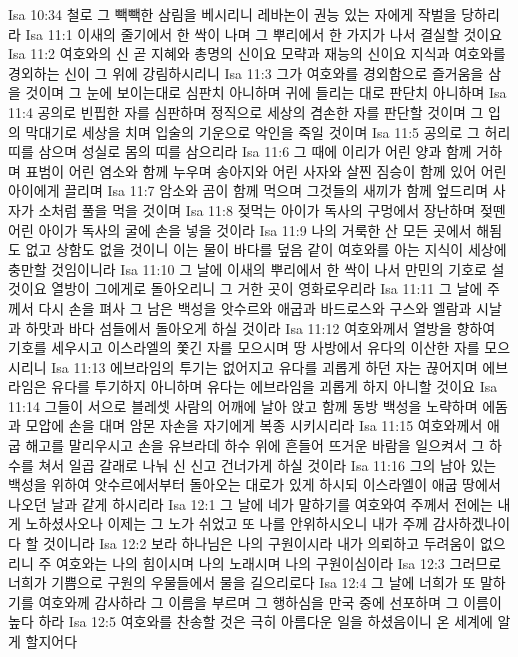 Isa 10:34  철로 그 빽빽한 삼림을 베시리니 레바논이 권능 있는 자에게 작벌을 당하리라
Isa 11:1  이새의 줄기에서 한 싹이 나며 그 뿌리에서 한 가지가 나서 결실할 것이요
Isa 11:2  여호와의 신 곧 지혜와 총명의 신이요 모략과 재능의 신이요 지식과 여호와를 경외하는 신이 그 위에 강림하시리니
Isa 11:3  그가 여호와를 경외함으로 즐거움을 삼을 것이며 그 눈에 보이는대로 심판치 아니하며 귀에 들리는 대로 판단치 아니하며
Isa 11:4  공의로 빈핍한 자를 심판하며 정직으로 세상의 겸손한 자를 판단할 것이며 그 입의 막대기로 세상을 치며 입술의 기운으로 악인을 죽일 것이며
Isa 11:5  공의로 그 허리띠를 삼으며 성실로 몸의 띠를 삼으리라
Isa 11:6  그 때에 이리가 어린 양과 함께 거하며 표범이 어린 염소와 함께 누우며 송아지와 어린 사자와 살찐 짐승이 함께 있어 어린 아이에게 끌리며
Isa 11:7  암소와 곰이 함께 먹으며 그것들의 새끼가 함께 엎드리며 사자가 소처럼 풀을 먹을 것이며
Isa 11:8  젖먹는 아이가 독사의 구멍에서 장난하며 젖뗀 어린 아이가 독사의 굴에 손을 넣을 것이라
Isa 11:9  나의 거룩한 산 모든 곳에서 해됨도 없고 상함도 없을 것이니 이는 물이 바다를 덮음 같이 여호와를 아는 지식이 세상에 충만할 것임이니라
Isa 11:10  그 날에 이새의 뿌리에서 한 싹이 나서 만민의 기호로 설 것이요 열방이 그에게로 돌아오리니 그 거한 곳이 영화로우리라
Isa 11:11  그 날에 주께서 다시 손을 펴사 그 남은 백성을 앗수르와 애굽과 바드로스와 구스와 엘람과 시날과 하맛과 바다 섬들에서 돌아오게 하실 것이라
Isa 11:12  여호와께서 열방을 향하여 기호를 세우시고 이스라엘의 쫓긴 자를 모으시며 땅 사방에서 유다의 이산한 자를 모으시리니
Isa 11:13  에브라임의 투기는 없어지고 유다를 괴롭게 하던 자는 끊어지며 에브라임은 유다를 투기하지 아니하며 유다는 에브라임을 괴롭게 하지 아니할 것이요
Isa 11:14  그들이 서으로 블레셋 사람의 어깨에 날아 앉고 함께 동방 백성을 노략하며 에돔과 모압에 손을 대며 암몬 자손을 자기에게 복종 시키시리라
Isa 11:15  여호와께서 애굽 해고를 말리우시고 손을 유브라데 하수 위에 흔들어 뜨거운 바람을 일으켜서 그 하수를 쳐서 일곱 갈래로 나눠 신 신고 건너가게 하실 것이라
Isa 11:16  그의 남아 있는 백성을 위하여 앗수르에서부터 돌아오는 대로가 있게 하시되 이스라엘이 애굽 땅에서 나오던 날과 같게 하시리라
Isa 12:1  그 날에 네가 말하기를 여호와여 주께서 전에는 내게 노하셨사오나 이제는 그 노가 쉬었고 또 나를 안위하시오니 내가 주께 감사하겠나이다 할 것이니라
Isa 12:2  보라 하나님은 나의 구원이시라 내가 의뢰하고 두려움이 없으리니 주 여호와는 나의 힘이시며 나의 노래시며 나의 구원이심이라
Isa 12:3  그러므로 너희가 기쁨으로 구원의 우물들에서 물을 길으리로다
Isa 12:4  그 날에 너희가 또 말하기를 여호와께 감사하라 그 이름을 부르며 그 행하심을 만국 중에 선포하며 그 이름이 높다 하라
Isa 12:5  여호와를 찬송할 것은 극히 아름다운 일을 하셨음이니 온 세계에 알게 할지어다
